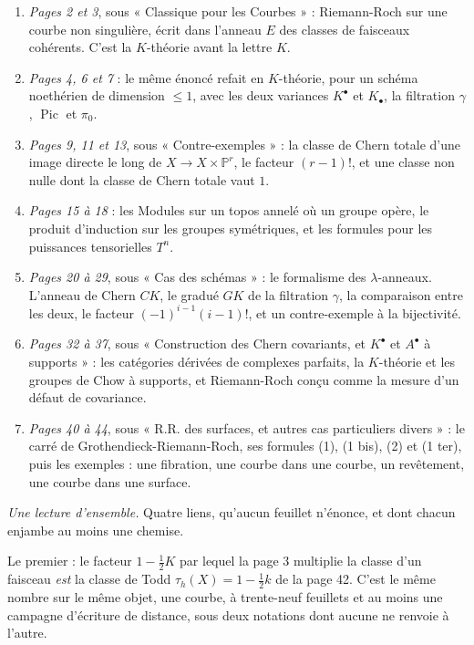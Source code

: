 \documentclass[11pt,a4paper]{article}
\begin{document}
\begin{enumerate}
  \item \emph{Pages 2 et 3}, sous « Classique pour les Courbes » :
  Riemann-Roch sur une courbe non singulière, écrit dans l'anneau $E$ des
  classes de faisceaux cohérents. C'est la $K$-théorie avant la lettre $K$.
  \item \emph{Pages 4, 6 et 7} : le même énoncé refait en $K$-théorie, pour un
  schéma noethérien de dimension $\leqslant 1$, avec les deux variances
  $K^{\bullet}$ et $K_{\bullet}$, la filtration $\gamma$, $\operatorname{Pic}$
  et $\pi_{0}$.
  \item \emph{Pages 9, 11 et 13}, sous « Contre-exemples » : la classe de Chern
  totale d'une image directe le long de $X \to X \times \mathbb{P}^{r}$, le
  facteur $(r-1)!$, et une classe non nulle dont la classe de Chern totale
  vaut $1$.
  \item \emph{Pages 15 à 18} : les Modules sur un topos annelé où un groupe
  opère, le produit d'induction sur les groupes symétriques, et les formules
  pour les puissances tensorielles $T^{n}$.
  \item \emph{Pages 20 à 29}, sous « Cas des schémas » : le formalisme des
  $\lambda$-anneaux. L'anneau de Chern $CK$, le gradué $GK$ de la filtration
  $\gamma$, la comparaison entre les deux, le facteur $(-1)^{i-1}(i-1)!$, et un
  contre-exemple à la bijectivité.
  \item \emph{Pages 32 à 37}, sous « Construction des Chern covariants, et
  $K^{\bullet}$ et $A^{\bullet}$ à supports » : les catégories dérivées de
  complexes parfaits, la $K$-théorie et les groupes de Chow à supports, et
  Riemann-Roch conçu comme la mesure d'un défaut de covariance.
  \item \emph{Pages 40 à 44}, sous « R.R. des surfaces, et autres cas
  particuliers divers » : le carré de Grothendieck-Riemann-Roch, ses formules
  (1), (1 bis), (2) et (1 ter), puis les exemples : une fibration, une courbe
  dans une courbe, un revêtement, une courbe dans une surface.
\end{enumerate}

\emph{Une lecture d'ensemble.} Quatre liens, qu'aucun
feuillet n'énonce, et dont chacun enjambe au moins une chemise.

Le premier : le facteur $1 - \tfrac{1}{2}K$ par lequel la page 3 multiplie la
classe d'un faisceau \emph{est} la classe de Todd $\tau_{h}(X) = 1 -
\tfrac{1}{2}k$ de la page 42. C'est le même nombre sur le même objet, une courbe,
à trente-neuf feuillets et au moins une campagne d'écriture de distance,
sous deux notations dont aucune ne renvoie à l'autre.
\end{document}
